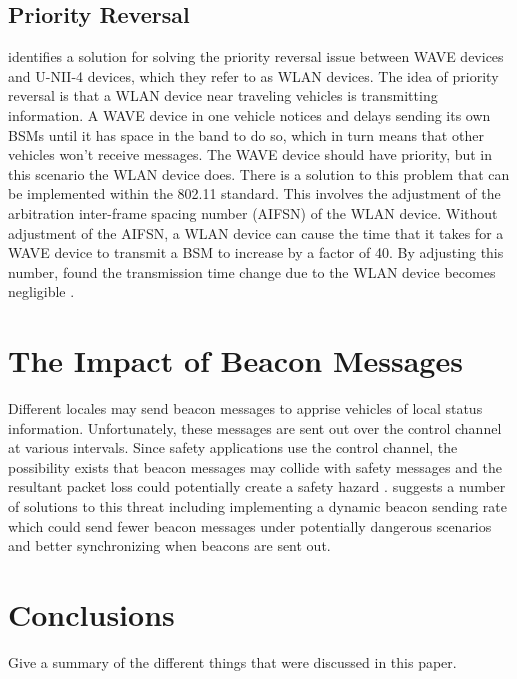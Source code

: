 \documentclass[twoside,conference]{IEEEtran}
\begin{document}
		 \subsection{Priority Reversal}
		 \cite{Park2014} identifies a solution for solving the priority reversal issue between WAVE devices and U-NII-4 devices, which they refer to as WLAN devices.  The idea of priority reversal is that a WLAN device near traveling vehicles is transmitting information.  A WAVE device in one vehicle notices and delays sending its own BSMs until it has space in the band to do so, which in turn means that other vehicles won't receive messages.  The WAVE device should have priority, but in this scenario the WLAN device does.  There is a solution to this problem that can be implemented within the 802.11 standard.  This involves the adjustment of the arbitration inter-frame spacing number (AIFSN) of the WLAN device.  Without adjustment of the AIFSN, a WLAN device can cause the time that it takes for a WAVE device to transmit a BSM to increase by a factor of 40.  By adjusting this number, found the transmission time change due to the WLAN device becomes negligible \cite[p. 165]{Park2014}.
		 
		
\section{The Impact of Beacon Messages}\label{sec:beacons}
		Different locales may send beacon messages to apprise vehicles of local status information. Unfortunately, these messages are sent out over the control channel at various intervals. Since safety applications use the control channel, the possibility exists that beacon messages may collide with safety messages and the resultant packet loss could potentially create a safety hazard \cite{Doukha2015}. \cite{Doukha2015} suggests a number of solutions to this threat including implementing a dynamic beacon sending rate which could send fewer beacon messages under potentially dangerous scenarios and better synchronizing when beacons are sent out.

\section{Conclusions}\label{sec:conclusions}
	Give a summary of the different things that were discussed in this paper.



\end{document}
